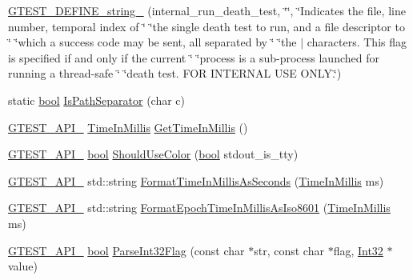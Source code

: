 \begin{DoxyCompactItemize}
\item 
\hyperlink{namespacetesting_1_1internal_a20bfd9d47d8dd167ffc1c37a4c9ff73e}{G\+T\+E\+S\+T\+\_\+\+D\+E\+F\+I\+N\+E\+\_\+string\+\_\+} (internal\+\_\+run\+\_\+death\+\_\+test, \char`\"{}\char`\"{}, \char`\"{}Indicates the file, line number, temporal index of \char`\"{} \char`\"{}the single death test to run, and a file descriptor to \char`\"{} \char`\"{}which a success code may be sent, all separated by \char`\"{} \char`\"{}the \textquotesingle{}$\vert$\textquotesingle{} characters.  This flag is specified if and only if the current \char`\"{} \char`\"{}process is a sub-\/process launched for running a thread-\/safe \char`\"{} \char`\"{}death test.  F\+OR I\+N\+T\+E\+R\+N\+AL U\+SE O\+N\+L\+Y.\char`\"{})
\item 
static \hyperlink{classbool}{bool} \hyperlink{namespacetesting_1_1internal_a6b8d22cee9edbbfe56077420a6fa1cb1}{Is\+Path\+Separator} (char c)
\item 
\hyperlink{gtest-port_8h_aa73be6f0ba4a7456180a94904ce17790}{G\+T\+E\+S\+T\+\_\+\+A\+P\+I\+\_\+} \hyperlink{namespacetesting_1_1internal_a66a845df404b38fe85c5e14a069f255a}{Time\+In\+Millis} \hyperlink{namespacetesting_1_1internal_ae66b46943a429e6efb1db456d4cae90c}{Get\+Time\+In\+Millis} ()
\item 
\hyperlink{gtest-port_8h_aa73be6f0ba4a7456180a94904ce17790}{G\+T\+E\+S\+T\+\_\+\+A\+P\+I\+\_\+} \hyperlink{classbool}{bool} \hyperlink{namespacetesting_1_1internal_ac1db1b4603967a6c4404f31cbbac31a6}{Should\+Use\+Color} (\hyperlink{classbool}{bool} stdout\+\_\+is\+\_\+tty)
\item 
\hyperlink{gtest-port_8h_aa73be6f0ba4a7456180a94904ce17790}{G\+T\+E\+S\+T\+\_\+\+A\+P\+I\+\_\+} std\+::string \hyperlink{namespacetesting_1_1internal_a904485f27a54be8a5a92856e2d838797}{Format\+Time\+In\+Millis\+As\+Seconds} (\hyperlink{namespacetesting_1_1internal_a66a845df404b38fe85c5e14a069f255a}{Time\+In\+Millis} ms)
\item 
\hyperlink{gtest-port_8h_aa73be6f0ba4a7456180a94904ce17790}{G\+T\+E\+S\+T\+\_\+\+A\+P\+I\+\_\+} std\+::string \hyperlink{namespacetesting_1_1internal_a5ef227c4a610e7ff638b12dfb25b068e}{Format\+Epoch\+Time\+In\+Millis\+As\+Iso8601} (\hyperlink{namespacetesting_1_1internal_a66a845df404b38fe85c5e14a069f255a}{Time\+In\+Millis} ms)
\item 
\hyperlink{gtest-port_8h_aa73be6f0ba4a7456180a94904ce17790}{G\+T\+E\+S\+T\+\_\+\+A\+P\+I\+\_\+} \hyperlink{classbool}{bool} \hyperlink{namespacetesting_1_1internal_ae3449e173767750b613114ceac6d916a}{Parse\+Int32\+Flag} (const char $\ast$str, const char $\ast$flag, \hyperlink{namespacetesting_1_1internal_a8ee38faaf875f133358abaf9bc056cec}{Int32} $\ast$value)

\end{DoxyCompactItemize}
